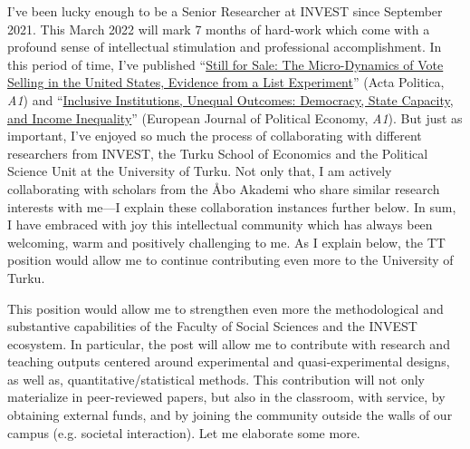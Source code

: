 \documentclass[10pt,stdletter,dateno,sigleft]{newlfm} %
\begin{document}
\begin{newlfm}
I've been lucky enough to be a Senior Researcher at INVEST since September 2021. This March 2022 will mark 7 months of hard-work which come with a profound sense of intellectual stimulation and professional accomplishment. In this period of time, I've published ``\href{https://link.springer.com/article/10.1057/s41269-020-00174-4}{Still for Sale: The Micro-Dynamics of Vote Selling in the United States, Evidence from a List Experiment}'' (Acta Politica, \emph{A1}) and ``\href{https://www.sciencedirect.com/science/article/pii/S0176268021000471?via%3Dihub}{Inclusive Institutions, Unequal Outcomes: Democracy, State Capacity, and Income Inequality}'' (European Journal of Political Economy, \emph{A1}). But just as important, I've enjoyed so much the process of collaborating with different researchers from INVEST, the Turku School of Economics and the Political Science Unit at the University of Turku. Not only that, I am actively collaborating with scholars from the \AA bo Akademi who share similar research interests with me---I explain these collaboration instances further below. In sum, I have embraced with joy this intellectual community which has always been welcoming, warm and positively challenging to me. As I explain below, the TT position would allow me to continue contributing even more to the University of Turku.

This position would allow me to strengthen even more the methodological and substantive capabilities of the Faculty of Social Sciences and the INVEST ecosystem. In particular, the post will allow me to contribute with research and teaching outputs centered around experimental and quasi-experimental designs, as well as, quantitative/statistical methods. This contribution will not only materialize in peer-reviewed papers, but also in the classroom, with service, by obtaining external funds, and by joining the community outside the walls of our campus (e.g. societal interaction). Let me elaborate some more. 


\end{newlfm}
\end{document}
